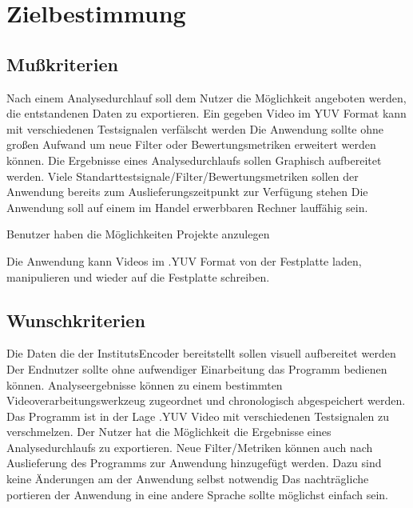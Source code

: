\chapter{Zielbestimmung}

\section{Mußkriterien}

 Nach einem Analysedurchlauf soll dem Nutzer die Möglichkeit angeboten werden, die entstandenen Daten zu exportieren.
 Ein gegeben Video im YUV Format kann mit verschiedenen Testsignalen verfälscht werden
 Die Anwendung sollte ohne großen Aufwand um neue Filter oder Bewertungsmetriken erweitert werden können.
 Die Ergebnisse eines Analysedurchlaufs sollen Graphisch aufbereitet werden.
  Viele Standarttestsignale/Filter/Bewertungsmetriken sollen der Anwendung bereits zum Auslieferungszeitpunkt zur Verfügung stehen
 Die Anwendung soll auf einem im Handel erwerbbaren Rechner lauffähig sein.

 Benutzer haben die Möglichkeiten Projekte anzulegen

 Die Anwendung kann Videos im .YUV Format von der Festplatte laden, manipulieren und wieder auf die Festplatte schreiben.


\setcounter{enumi}{0}

\section{Wunschkriterien}

 Die Daten die der InstitutsEncoder bereitstellt sollen visuell aufbereitet werden
 Der Endnutzer sollte ohne aufwendiger Einarbeitung das Programm bedienen können.
 Analyseergebnisse können zu einem bestimmten Videoverarbeitungswerkzeug zugeordnet und chronologisch abgespeichert werden.
 Das Programm ist in der Lage .YUV Video mit verschiedenen Testsignalen zu verschmelzen.
 Der Nutzer hat die Möglichkeit die Ergebnisse eines Analysedurchlaufs zu exportieren.
 Neue Filter/Metriken können auch nach Auslieferung des Programms zur Anwendung hinzugefügt werden. Dazu
  sind keine Änderungen am der Anwendung selbst notwendig
 Das nachträgliche portieren der Anwendung in eine andere Sprache sollte möglichst einfach sein.

